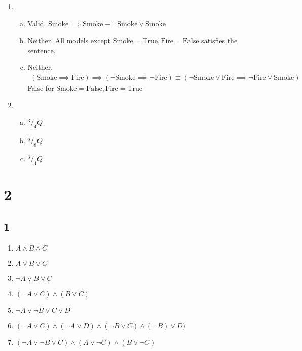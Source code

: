 \begin{enumerate}
    \item
        \begin{enumerate}[a.]
            \item Valid. $\text{Smoke} \implies \text{Smoke} \equiv \neg \text{Smoke} \vee \text{Smoke}$
            \item Neither. All models except $\text{Smoke} = \text{True}, \text{Fire} = \text{False}$ satisfies the sentence.
            \item Neither. 
                \begin{gather*}
                    (\text{Smoke} \implies \text{Fire}) \implies (\neg \text{Smoke} \implies \neg \text{Fire})
                    \equiv (\neg \text{Smoke} \vee \text{Fire} \implies \neg \text{Fire} \vee \text{Smoke})
                \end{gather*}
                False for $\text{Smoke} = \text{False}, \text{Fire} = \text{True}$
        \end{enumerate}
    \item
        \begin{enumerate}[a.]
            \item $^3/_4 Q$
            \item $^5/_8 Q$
            \item $^3/_4 Q$
        \end{enumerate}
\end{enumerate}

\section*{2}
\subsection*{1}
\begin{enumerate}
    \item $A \wedge B \wedge C$
    \item $A \vee B \vee C$
    \item $\neg A \vee B \vee C$
    \item $(\neg A \vee C) \wedge (B \vee C)$
    \item $\neg A \vee \neg B \vee C \vee D$
    \item $(\neg A \vee C) \wedge (\neg A \vee D) \wedge (\neg B \vee C) \wedge (\neg B) \vee D)$
    \item $(\neg A \vee \neg B \vee C) \wedge (A \vee \neg C) \wedge (B \vee \neg C)$
\end{enumerate}
